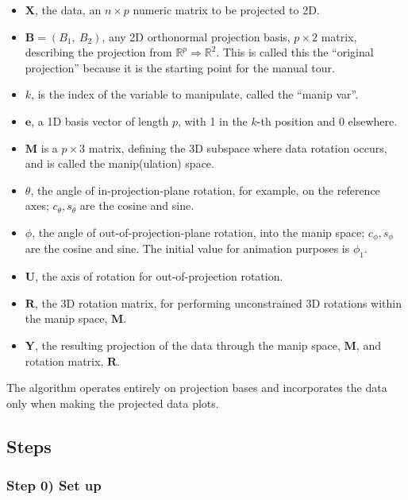 \begin{itemize}
\tightlist
\item
  \(\textbf{X}\), the data, an \(n \times p\) numeric matrix to be
  projected to 2D.
\item
  \(\textbf{B} = (B_1,~ B_2)\), any 2D orthonormal projection basis,
  \(p \times 2\) matrix, describing the projection from
  \(\mathbb{R}^p \Rightarrow \mathbb{R}^2\). This is called this the
  ``original projection'' because it is the starting point for the
  manual tour.
\item
  \(k\), is the index of the variable to manipulate, called the ``manip
  var''. 
\item
  \(\textbf{e}\), a 1D basis vector of length \(p\), with 1 in the
  \(k\)-th position and 0 elsewhere.
\item
  \(\textbf{M}\) is a \(p \times 3\) matrix, defining the 3D subspace
  where data rotation occurs, and is called the manip(ulation) space.
\item
  \(\theta\), the angle of in-projection-plane rotation, for example, on
  the reference axes; \(c_\theta, s_\theta\) are the cosine and sine.
\item
  \(\phi\), the angle of out-of-projection-plane rotation, into the
  manip space; \(c_\phi, s_\phi\) are the cosine and sine. The initial
  value for animation purposes is \(\phi_1\).
\item
  \(\textbf{U}\), the axis of rotation for out-of-projection rotation.
\item
  \(\textbf{R}\), the 3D rotation matrix, for performing unconstrained
  3D rotations within the manip space, \(\textbf{M}\).
\item
  \(\textbf{Y}\), the resulting projection of the data through the manip
  space, \(\textbf{M}\), and rotation matrix, \(\textbf{R}\). 
\end{itemize}

The algorithm operates entirely on projection bases and incorporates the
data only when making the projected data plots.

\hypertarget{steps}{%
\subsection{Steps}\label{steps}}

\hypertarget{step-0-set-up}{%
\subsubsection{Step 0) Set up}\label{step-0-set-up}}


